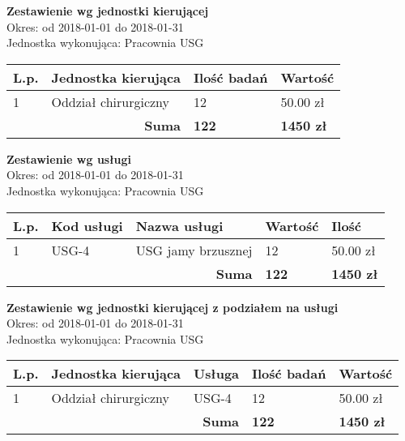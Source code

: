 \documentclass[a4paper,10pt]{article}
\date{}
\begin{document}
	
	\noindent
	\textbf{\LARGE{Zestawienie wg jednostki kierującej}}\\
	
	\noindent
		Okres: od 2018-01-01 do 2018-01-31\\	
		Jednostka wykonująca: Pracownia USG\\
	
	
		\begin{longtable}[l]{| l | l | l | l|}	
			\hline
			\textbf{L.p.} & \textbf{Jednostka kierująca} & \textbf{Ilość badań} & \textbf{Wartość} \\ \hline
			\endhead
			1 & Oddział chirurgiczny & 12 & 50.00 zł \\ \hline
			\multicolumn{2}{|r|}{\textbf{Suma}} & \textbf{122} & \textbf{1450 zł} \\ \hline
		\end{longtable}
	\newpage
	
	\noindent
	\textbf{\LARGE{Zestawienie wg usługi}}\\
	
	\noindent
	Okres: od 2018-01-01 do 2018-01-31\\	
	Jednostka wykonująca: Pracownia USG\\
	
	
	\begin{longtable}[l]{| l | l | l | l| l |}	
		\hline
		\textbf{L.p.} & \textbf{Kod usługi} & \textbf{Nazwa usługi} & \textbf{Wartość} & \textbf{Ilość} \\ \hline
		\endhead
		1 & USG-4 & USG jamy brzusznej & 12 & 50.00 zł \\ \hline
		\multicolumn{3}{|r|}{\textbf{Suma}} & \textbf{122} & \textbf{1450 zł} \\ \hline
	\end{longtable}
	\newpage
	
	\noindent
	\textbf{\LARGE{Zestawienie wg jednostki kierującej z podziałem na usługi}}\\
	
	\noindent
	Okres: od 2018-01-01 do 2018-01-31\\	
	Jednostka wykonująca: Pracownia USG\\
	
	
	\begin{longtable}[l]{| l | l | l | l| l |}	
		\hline
		\textbf{L.p.} & \textbf{Jednostka kierująca} & \textbf{Usługa} & \textbf{Ilość badań} & \textbf{Wartość} \\ \hline
		\endhead
		1 & Oddział chirurgiczny & USG-4 & 12 & 50.00 zł \\ \hline
		\multicolumn{3}{|r|}{\textbf{Suma}} & \textbf{122} & \textbf{1450 zł} \\ \hline
	\end{longtable}
	
\end{document}
